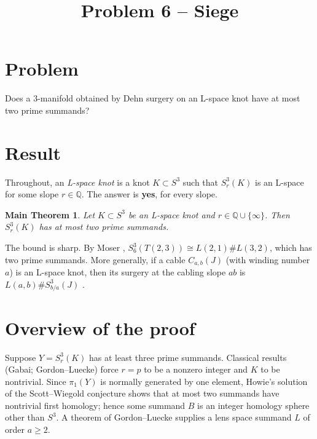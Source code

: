 \documentclass[11pt]{article}
\title{Problem 6 -- Siege}
\author{}
\date{}
\newtheorem*{maintheorem}{Main Theorem}
\theoremstyle{definition}
\newcommand{\Q}{\mathbb{Q}}
\begin{document}
\maketitle

\section*{Problem}

Does a $3$-manifold obtained by Dehn surgery on an L-space knot have at most two prime summands?

\section*{Result}

Throughout, an \emph{L-space knot} is a knot $K\subset S^3$ such that $S^3_r(K)$ is an L-space for some slope $r\in\Q$. The answer is \textbf{yes}, for every slope.

\begin{maintheorem}
Let $K\subset S^3$ be an L-space knot and $r\in\Q\cup\{\infty\}$. Then $S^3_r(K)$ has at most two prime summands.
\end{maintheorem}

The bound is sharp. By Moser \cite{Moser}, $S^3_6(T(2,3))\cong L(2,1)\# L(3,2)$, which has two prime summands. More generally, if a cable $C_{a,b}(J)$ (with winding number $a$) is an L-space knot, then its surgery at the cabling slope $ab$ is $L(a,b)\# S^3_{b/a}(J)$ \cite{Gordon83}.

\section*{Overview of the proof}

Suppose $Y=S^3_r(K)$ has at least three prime summands. Classical results (Gabai; Gordon--Luecke) force $r=p$ to be a nonzero integer and $K$ to be nontrivial. Since $\pi_1(Y)$ is normally generated by one element, Howie's solution of the Scott--Wiegold conjecture shows that at most two summands have nontrivial first homology; hence some summand $B$ is an integer homology sphere other than $S^3$. A theorem of Gordon--Luecke supplies a lens space summand $L$ of order $a\ge 2$.
\end{document}
